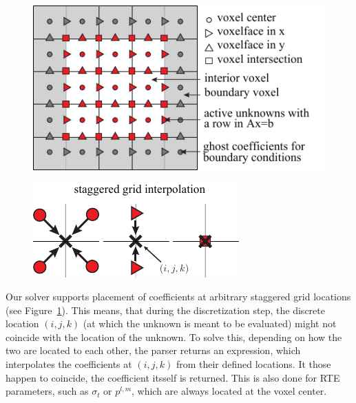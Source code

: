 \begin{figure}[h]

\centering
\includegraphics[width=0.9\columnwidth]{figures/fig_staggered_grids.pdf}
\label{fig:staggeredgrid}
\end{figure}

\begin{figure}
\hspace{-.1in}
\includegraphics[width=0.6\columnwidth]{figures/fig_staggered_interpolation.pdf}
\vspace{-.1in}
\end{figure}Our solver supports placement of coefficients at arbitrary staggered grid locations (see Figure~\ref{fig:staggeredgrid}). This means, that during the discretization step, the discrete location $(i, j, k)$ (at which the unknown is meant to be evaluated) might not coincide with the location of the unknown. To solve this, depending on how the two are located to each other, the parser returns an expression, which interpolates the coefficients at $(i, j, k)$ from their defined locations. It those happen to coincide, the coefficient itsself is returned. This is also done for RTE parameters, such as $\sigma_t$ or $p^{l,m}$, which are always located at the voxel center.



